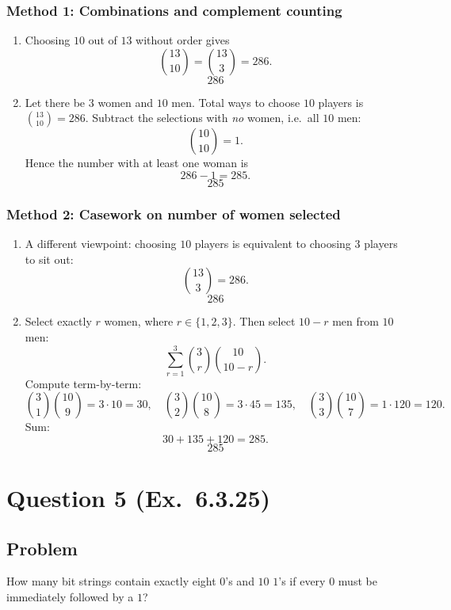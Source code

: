 \documentclass[12pt]{article}
\begin{document}
\subsubsection{Method 1: Combinations and complement counting}
\begin{enumerate}[label=(\alph*)]
\item Choosing $10$ out of $13$ without order gives
\[
\binom{13}{10}=\binom{13}{3}=286.
\]
\[
\boxed{286}
\]

\item Let there be $3$ women and $10$ men. Total ways to choose $10$ players is $\binom{13}{10}=286$.
Subtract the selections with \emph{no} women, i.e.\ all $10$ men:
\[
\binom{10}{10}=1.
\]
Hence the number with at least one woman is
\[
286-1=285.
\]
\[
\boxed{285}
\]
\end{enumerate}

\subsubsection{Method 2: Casework on number of women selected}
\begin{enumerate}[label=(\alph*)]
\item A different viewpoint: choosing $10$ players is equivalent to choosing $3$ players to sit out:
\[
\binom{13}{3}=286.
\]
\[
\boxed{286}
\]

\item Select exactly $r$ women, where $r\in\{1,2,3\}$. Then select $10-r$ men from $10$ men:
\[
\sum_{r=1}^{3}\binom{3}{r}\binom{10}{10-r}.
\]
Compute term-by-term:
\[
\binom{3}{1}\binom{10}{9}=3\cdot 10=30,\quad
\binom{3}{2}\binom{10}{8}=3\cdot 45=135,\quad
\binom{3}{3}\binom{10}{7}=1\cdot 120=120.
\]
Sum:
\[
30+135+120=285.
\]
\[
\boxed{285}
\]
\end{enumerate}

\newpage

\section{Question 5 (Ex.\ 6.3.25)}
\subsection{Problem}
How many bit strings contain exactly eight $0$'s and $10$ $1$'s if every $0$ must be immediately followed by a $1$?
\end{document}
